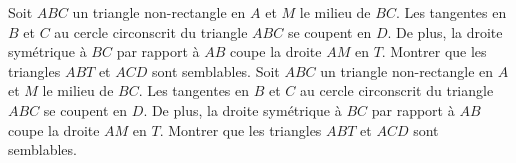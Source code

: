 {Soit $ABC$ un triangle non-rectangle en $A$ et $M$ le milieu de $BC$. Les tangentes en $B$ et $C$ au cercle circonscrit du triangle $ABC$ se coupent en $D$. De plus, la droite symétrique à $BC$ par rapport à $AB$ coupe la droite $AM$ en $T$. Montrer que les triangles $ABT$ et $ACD$ sont semblables.}%
{Soit $ABC$ un triangle non-rectangle en $A$ et $M$ le milieu de $BC$. Les tangentes en $B$ et $C$ au cercle circonscrit du triangle $ABC$ se coupent en $D$. De plus, la droite symétrique à $BC$ par rapport à $AB$ coupe la droite $AM$ en $T$. Montrer que les triangles $ABT$ et $ACD$ sont semblables.}
{}